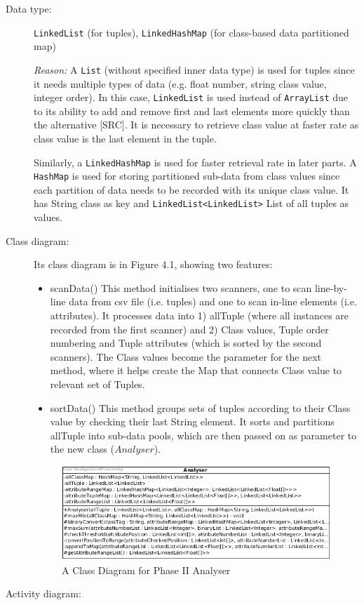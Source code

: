 \begin{description}
\item[Data type: ] \texttt{LinkedList} (for tuples), \texttt{LinkedHashMap} (for class-based data partitioned map)

\textit{Reason: } A \texttt{List} (without specified inner data type) is used for tuples since it needs multiple types of data (e.g. float number, string class value, integer order). In this case, \texttt{LinkedList} is used instead of \texttt{ArrayList} due to its ability to add and remove first and last elements more quickly than the alternative [SRC]. It is necessary to retrieve class value at faster rate as class value is the last element in the tuple.

Similarly, a \texttt{LinkedHashMap} is used for faster retrieval rate in later parts. A \texttt{HashMap} is used for storing partitioned sub-data from class values since each partition of data needs to be recorded with its unique class value. It has String class as key and \texttt{LinkedList<LinkedList>} List of all tuples as values. 

\item[Class diagram: ] 

Its class diagram is in Figure 4.1, showing two features:
\begin{itemize}
	\item scanData()
	This method initialises two scanners, one to scan line-by-line data from csv file (i.e. tuples) and one to scan in-line elements (i.e. attributes).
	It processes data into 1) allTuple (where all instances are recorded from the first scanner) and 2) Class values, Tuple order numbering and Tuple attributes (which is sorted by the second scanners).
	The Class values become the parameter for the next method, where it helps create the Map that connects Class value to relevant set of Tuples.
	\item sortData()
	This method groups sets of tuples according to their Class value by checking their last String element. It sorts and partitions allTuple into sub-data pools, which are then passed on as parameter to the new class ($Analyser$).
	
\end{itemize}

\begin{figure}[t]
    \centering
    \includegraphics[width=5in]{figures/class_analyser}
    \caption[A Class Diagram for Phase II Analyser]{A Class Diagram for Phase II Analyser}
    \label{fig:figure4_2}
\end{figure}

\item[Activity diagram: ] 
\end{description}





